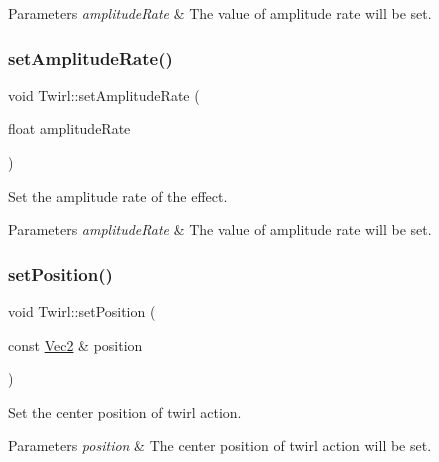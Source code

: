 \begin{DoxyParams}{Parameters}
{\em amplitude\+Rate} & The value of amplitude rate will be set. \\
\hline
\end{DoxyParams}
\mbox{\label{classTwirl_a498a1b1fee7b27570130b6c19ca67b38}} 
\subsubsection{\texorpdfstring{set\+Amplitude\+Rate()}{setAmplitudeRate()}\hspace{0.1cm}{\footnotesize\ttfamily [2/2]}}
{\footnotesize\ttfamily void Twirl\+::set\+Amplitude\+Rate (\begin{DoxyParamCaption}\item[{float}]{amplitude\+Rate }\end{DoxyParamCaption})\hspace{0.3cm}{\ttfamily [inline]}}



Set the amplitude rate of the effect. 


\begin{DoxyParams}{Parameters}
{\em amplitude\+Rate} & The value of amplitude rate will be set. \\
\hline
\end{DoxyParams}
\mbox{\label{classTwirl_a246973ddc49ac4e1a852e73c879c9bcf}} 
\subsubsection{\texorpdfstring{set\+Position()}{setPosition()}\hspace{0.1cm}{\footnotesize\ttfamily [1/2]}}
{\footnotesize\ttfamily void Twirl\+::set\+Position (\begin{DoxyParamCaption}\item[{const \hyperlink{classVec2}{Vec2} \&}]{position }\end{DoxyParamCaption})}



Set the center position of twirl action. 


\begin{DoxyParams}{Parameters}
{\em position} & The center position of twirl action will be set. \\
\hline
\end{DoxyParams}
\mbox{\label{classTwirl_a246973ddc49ac4e1a852e73c879c9bcf}} 
